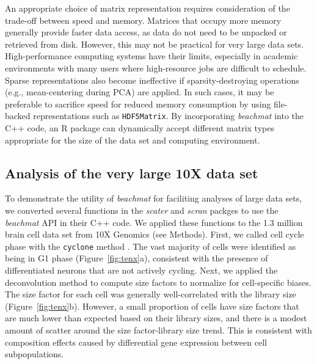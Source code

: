 \documentclass[10pt,letterpaper]{article}
\newcommand{\beachmat}{\textit{beachmat}}
\newcommand{\code}[1]{\texttt{#1}}
\begin{document}
An appropriate choice of matrix representation requires consideration of the trade-off between speed and memory.
Matrices that occupy more memory generally provide faster data access, as data do not need to be unpacked or retrieved from disk.
However, this may not be practical for very large data sets.
High-performance computing systems have their limits, especially in academic environments with many users where high-resource jobs are difficult to schedule.
Sparse representations also become ineffective if sparsity-destroying operations (e.g., mean-centering during PCA) are applied.
In such cases, it may be preferable to sacrifice speed for reduced memory consumption by using file-backed representations such as \code{HDF5Matrix}.
By incorporating \beachmat{} into the C++ code, an R package can dynamically accept different matrix types appropriate for the size of the data set and computing environment.

\subsection*{Analysis of the very large 10X data set}
To demonstrate the utility of \beachmat{} for faciliting analyses of large data sets, we converted several functions in the \textit{scater} \cite{mccarthy2017scater} and \textit{scran} packges \cite{lun2016stepbystep} to use the \beachmat{} API in their C++ code.
We applied these functions to the 1.3 million brain cell data set from 10X Genomics (see Methods).
First, we called cell cycle phase with the \code{cyclone} method \cite{scialdone2015computational}. 
The vast majority of cells were identified as being in G1 phase (Figure~\ref{fig:tenx}a), consistent with the presence of differentiated neurons that are not actively cycling.
Next, we applied the deconvolution method \cite{lun2016pooling} to compute size factors to normalize for cell-specific biases.
The size factor for each cell was generally well-correlated with the library size (Figure~\ref{fig:tenx}b).
However, a small proportion of cells have size factors that are much lower than expected based on their library sizes, and there is a modest amount of scatter around the size factor-library size trend.
This is consistent with composition effects \cite{robinson2010scaling} caused by differential gene expression between cell subpopulations.
\end{document}
